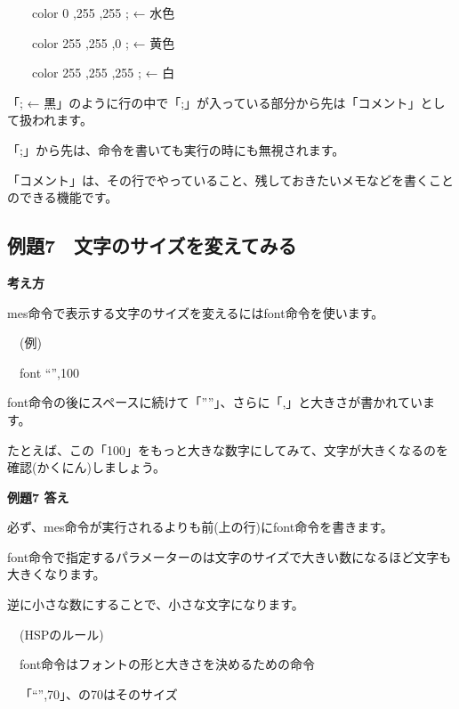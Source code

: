 \documentclass[a4paper,12pt]{jarticle}
\begin{document}
\ \ \ \ color 0 ,255 ,255 ; ← 水色 

\ \ \ \ color 255 ,255 ,0 ; ← 黄色 

\ \ \ \ color 255 ,255 ,255 ; ← 白 


\bigskip
\bigskip

「; ← 黒」のように行の中で「;」が入っている部分から先は「コメント」として扱われます。

「;」から先は、命令を書いても実行の時にも無視されます。

「コメント」は、その行でやっていること、残しておきたいメモなどを書くことのできる機能です。

\bigskip
\bigskip



\clearpage
\subsection{例題7　文字のサイズを変えてみる}
\bigskip
\bigskip

{\bfseries
考え方}

\bigskip

mes命令で表示する文字のサイズを変えるにはfont命令を使います。


\bigskip

\ \ (例)

\ \ font “”,100


\bigskip

font命令の後にスペースに続けて「””」、さらに「,」と大きさが書かれています。

たとえば、この「100」をもっと大きな数字にしてみて、文字が大きくなるのを確認(かくにん)しましょう。

\bigskip

\bigskip

{\bfseries
例題7 答え}

\bigskip

必ず、mes命令が実行されるよりも前(上の行)にfont命令を書きます。

font命令で指定するパラメーターのは文字のサイズで大きい数になるほど文字も大きくなります。

逆に小さな数にすることで、小さな文字になります。


\bigskip

\ \ (HSPのルール)


\bigskip

\ \ font命令はフォントの形と大きさを決めるための命令

\ \ 「“”,70」、の70はそのサイズ


\bigskip
\end{document}
